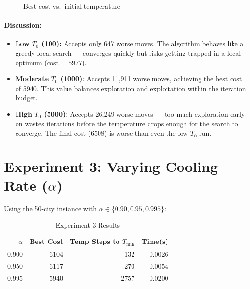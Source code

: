 \documentclass[12pt,a4paper]{article}
\begin{document}
\begin{figure}[H]
\centering
{}
\caption{Best cost vs.\ initial temperature}
\end{figure}

\paragraph{Discussion:}
\begin{itemize}
    \item \textbf{Low $T_0$ (100):} Accepts only 647 worse moves. The algorithm behaves like a greedy local search --- converges quickly but risks getting trapped in a local optimum (cost = 5977).
    \item \textbf{Moderate $T_0$ (1000):} Accepts 11{,}911 worse moves, achieving the best cost of 5940. This value balances exploration and exploitation within the iteration budget.
    \item \textbf{High $T_0$ (5000):} Accepts 26{,}249 worse moves --- too much exploration early on wastes iterations before the temperature drops enough for the search to converge. The final cost (6508) is worse than even the low-$T_0$ run.
\end{itemize}

\section{Experiment 3: Varying Cooling Rate ($\alpha$)}

Using the 50-city instance with $\alpha \in \{0.90, 0.95, 0.995\}$:

\begin{table}[H]
\centering
\caption{Experiment 3 Results}
\begin{tabular}{@{}rrrr@{}}
\toprule
\textbf{$\alpha$} & \textbf{Best Cost} & \textbf{Temp Steps to $T_{\min}$} & \textbf{Time(s)} \\
\midrule
0.900 & 6104 & 132 & 0.0026 \\
0.950 & 6117 & 270 & 0.0054 \\
0.995 & 5940 & 2757 & 0.0200 \\
\bottomrule
\end{tabular}
\end{table}
\end{document}

